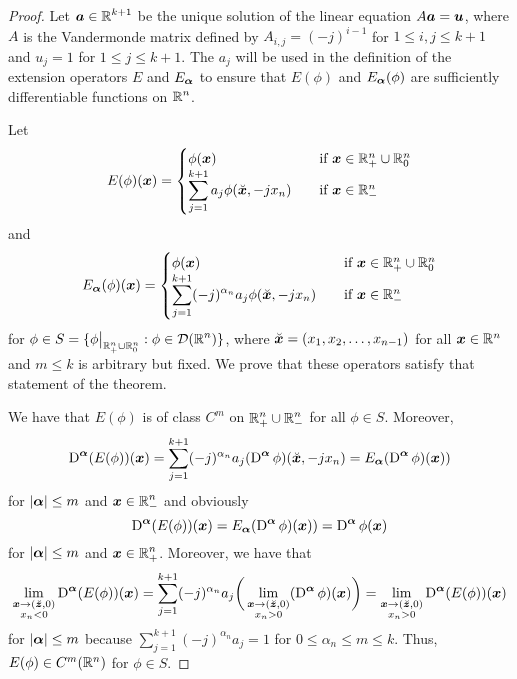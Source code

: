 \begin{proof}
Let $\displaystyle {\bm{a}} \in \mathbb{R}^{k+1}$ be the unique solution of
the linear equation $A {\bm{a}} = {\bm{u}}$, where $A$ is the
Vandermonde matrix defined by $\displaystyle A_{i,j} = (-j)^{i-1}$ for
$1 \leq i,j \leq k+1$ and $u_j = 1$ for $1 \leq j \leq k+1$.  The
$a_j$ will be used in the definition of the extension operators $E$
and $E_{{\bm{\alpha}}}$ to ensure that $E(\phi)$ and
$E_{{\bm{\alpha}}}(\phi)$ are
sufficiently differentiable functions on $\displaystyle \mathbb{R}^n$.

Let
\[
E(\phi)({\bm{x}})
= \begin{cases}
\phi({\bm{x}}) & \quad \text{if} \ {\bm{x}} \in \mathbb{R}^n_+ \cup \mathbb{R}^n_0 \\
\displaystyle \sum_{j=1}^{k+1} a_j \phi(\breve{{\bm{x}}},-jx_n)
& \quad \text{if} \ {\bm{x}} \in \mathbb{R}^n_-
\end{cases}
\]
and
\[
E_{{\bm{\alpha}}}(\phi)({\bm{x}})
= \begin{cases}
\phi({\bm{x}}) & \quad \text{if} \ {\bm{x}} \in \mathbb{R}^n_+ \cup \mathbb{R}^n_0 \\
\displaystyle \sum_{j=1}^{k+1} (-j)^{\alpha_n} a_j \phi(\breve{{\bm{x}}},-jx_n)
& \quad \text{if} \ {\bm{x}} \in \mathbb{R}^n_-
\end{cases}
\]
for $\displaystyle \phi \in S = \{ \phi\big|_{\mathbb{R}^n_+ \cup \mathbb{R}^n_0} :
\phi \in \mathcal{D}(\mathbb{R}^n) \}$,
where $\breve{{\bm{x}}} = (x_1,x_2,\ldots, x_{n-1})$ for all
${\bm{x}} \in \mathbb{R}^n$ and $m \leq k$ is arbitrary but fixed.  We prove
that these operators satisfy that statement of the theorem.

We have that $E(\phi)$ is of class $\displaystyle C^m$ on
$\displaystyle \mathbb{R}^n_+ \cup \mathbb{R}^n_-$ for all $\phi \in S$.
Moreover,
\[
\operatorname{D}^{{\bm{\alpha}}} (E(\phi))({\bm{x}}) 
= \sum_{j=1}^{k+1} (-j)^{\alpha_n} a_j (\operatorname{D}^{{\bm{\alpha}}} \phi)
(\breve{{\bm{x}}},-jx_n)
= E_{{\bm{\alpha}}}(\operatorname{D}^{{\bm{\alpha}}} \phi)({\bm{x}}))
\]
for $|{\bm{\alpha}}| \leq m$ and $\displaystyle {\bm{x}} \in \mathbb{R}^n_-$
and obviously
\[
\operatorname{D}^{{\bm{\alpha}}} (E(\phi))({\bm{x}}) = E_{{\bm{\alpha}}}
(\operatorname{D}^{{\bm{\alpha}}} \phi)({\bm{x}})) = \operatorname{D}^{{\bm{\alpha}}} \phi ({\bm{x}})
\]
for $|{\bm{\alpha}}| \leq m$ and $\displaystyle {\bm{x}} \in \mathbb{R}^n_+$.
Moreover, we have that
\[
\lim_{\substack{{\bm{x}}\to (\breve{{\bm{z}}},0)\\x_n<0}}
\operatorname{D}^{{\bm{\alpha}}} (E(\phi))({\bm{x}}) 
= \sum_{j=1}^{k+1} (-j)^{\alpha_n} a_j
\bigg( \lim_{\substack{{\bm{x}}\to (\breve{{\bm{z}}},0)\\x_n>0}}
(\operatorname{D}^{{\bm{\alpha}}} \phi)({\bm{x}}) \bigg) =
\lim_{\substack{{\bm{x}}\to (\breve{{\bm{z}}},0)\\x_n>0}}
\operatorname{D}^{{\bm{\alpha}}} (E(\phi))({\bm{x}})
\]
for $|{\bm{\alpha}}| \leq m$
because $\displaystyle \sum_{j=1}^{k+1} (-j)^{\alpha_n}a_j = 1$ for
$0 \leq \alpha_n \leq m \leq k$.  Thus, $E(\phi) \in C^m(\mathbb{R}^n)$ for
$\phi \in S$.


\end{proof}
